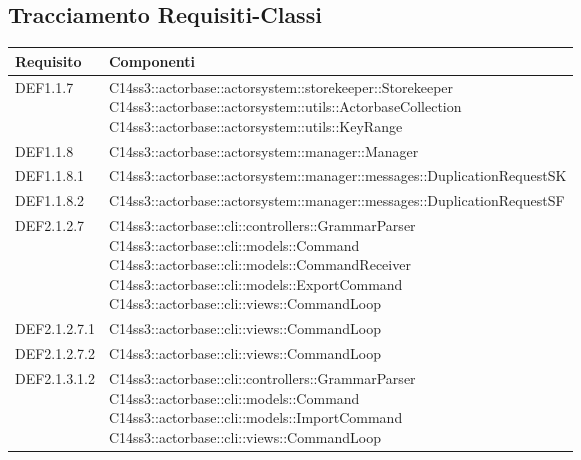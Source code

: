 \documentclass{scalatekids-article}
\begin{document}
\subsection{Tracciamento Requisiti-Classi}
\begin{longtable}[H]{|p{4.5cm}|p{13cm}|}
\hline
\textbf{Requisito} & \textbf{Componenti}\\
\hline
DEF1.1.7 & \multiLineCell[t]{C14ss3::actorbase::actorsystem::storekeeper::Storekeeper\\C14ss3::actorbase::actorsystem::utils::ActorbaseCollection\\C14ss3::actorbase::actorsystem::utils::KeyRange\\}\\
\hline
DEF1.1.8 & \multiLineCell[t]{C14ss3::actorbase::actorsystem::manager::Manager\\}\\
\hline
DEF1.1.8.1 & \multiLineCell[t]{C14ss3::actorbase::actorsystem::manager::messages::DuplicationRequestSK\\}\\
\hline
DEF1.1.8.2 & \multiLineCell[t]{C14ss3::actorbase::actorsystem::manager::messages::DuplicationRequestSF\\}\\
\hline
DEF2.1.2.7 & \multiLineCell[t]{C14ss3::actorbase::cli::controllers::GrammarParser\\C14ss3::actorbase::cli::models::Command\\C14ss3::actorbase::cli::models::CommandReceiver\\C14ss3::actorbase::cli::models::ExportCommand\\C14ss3::actorbase::cli::views::CommandLoop\\}\\
\hline
DEF2.1.2.7.1 & \multiLineCell[t]{C14ss3::actorbase::cli::views::CommandLoop\\}\\
\hline
DEF2.1.2.7.2 & \multiLineCell[t]{C14ss3::actorbase::cli::views::CommandLoop\\}\\
\hline
DEF2.1.3.1.2 & \multiLineCell[t]{C14ss3::actorbase::cli::controllers::GrammarParser\\C14ss3::actorbase::cli::models::Command\\C14ss3::actorbase::cli::models::ImportCommand\\C14ss3::actorbase::cli::views::CommandLoop\\}\\

\end{longtable}
\end{document}
